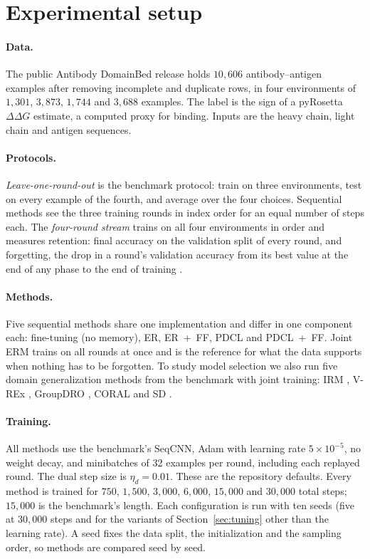 \documentclass[10pt]{article}
\begin{document}
\section{Experimental setup}
\label{sec:setup}

\paragraph{Data.}
The public Antibody DomainBed release \citep{tagasovska2024antibody} holds $10{,}606$ antibody--antigen examples after removing incomplete and duplicate rows, in four environments of $1{,}301$, $3{,}873$, $1{,}744$ and $3{,}688$ examples. The label is the sign of a pyRosetta $\Delta\Delta G$ estimate, a computed proxy for binding. Inputs are the heavy chain, light chain and antigen sequences.

\paragraph{Protocols.}
\emph{Leave-one-round-out} is the benchmark protocol: train on three environments, test on every example of the fourth, and average over the four choices. Sequential methods see the three training rounds in index order for an equal number of steps each. The \emph{four-round stream} trains on all four environments in order and measures retention: final accuracy on the validation split of every round, and forgetting, the drop in a round's validation accuracy from its best value at the end of any phase to the end of training \citep{elenter2023primal}.

\paragraph{Methods.}
Five sequential methods share one implementation and differ in one component each: fine-tuning (no memory), ER, ER~+~FF, PDCL and PDCL~+~FF. Joint ERM trains on all rounds at once and is the reference for what the data supports when nothing has to be forgotten. To study model selection we also run five domain generalization methods from the benchmark with joint training: IRM \citep{arjovsky2019invariant}, V-REx \citep{krueger2021out}, GroupDRO \citep{sagawa2020distributionally}, CORAL \citep{sun2016deep} and SD \citep{pezeshki2021gradient}.

\paragraph{Training.}
All methods use the benchmark's SeqCNN, Adam with learning rate $5\times10^{-5}$, no weight decay, and minibatches of 32 examples per round, including each replayed round. The dual step size is $\eta_d=0.01$. These are the repository defaults. Every method is trained for $750$, $1{,}500$, $3{,}000$, $6{,}000$, $15{,}000$ and $30{,}000$ total steps; $15{,}000$ is the benchmark's length. Each configuration is run with ten seeds (five at $30{,}000$ steps and for the variants of Section~\ref{sec:tuning} other than the learning rate). A seed fixes the data split, the initialization and the sampling order, so methods are compared seed by seed.
\end{document}
